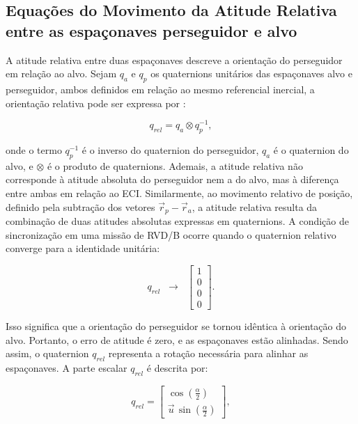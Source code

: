 \subsection{Equações do Movimento da Atitude Relativa entre as espaçonaves perseguidor e alvo}

A atitude relativa entre duas espaçonaves descreve a orientação do perseguidor em relação ao alvo.
Sejam $q_a$ e $q_p$ os quaternions unitários das espaçonaves alvo e perseguidor, ambos definidos em relação ao mesmo referencial inercial, a orientação relativa pode ser expressa por \cite{na2019vision}:

\begin{equation}
q_{rel}
=
q_a \otimes q_p^{-1},
\label{eq:quat_relativo}
\end{equation}

onde o termo $q_p^{-1}$ é o inverso do quaternion do perseguidor, $q_a$ é o quaternion do alvo, e $\otimes$ é o produto de quaternions.
Ademais, a atitude relativa não corresponde à atitude absoluta do perseguidor nem a do alvo, mas à diferença entre ambas em relação ao ECI. 
Similarmente, ao movimento relativo de posição, definido pela subtração dos vetores $\vec r_p - \vec r_a$, a atitude relativa resulta da combinação de duas atitudes absolutas expressas em quaternions. 
A condição de sincronização em uma missão de RVD/B ocorre quando o quaternion relativo converge para a identidade unitária:

\begin{equation}
\label{eq:qrel_sincronizacao}
q_{rel} \;\;\longrightarrow\;\; 
\begin{bmatrix}1 \\ 0 \\ 0 \\ 0\end{bmatrix}.
\end{equation}

Isso significa que a orientação do perseguidor se tornou idêntica à orientação do alvo. 
Portanto, o erro de atitude é zero, e as espaçonaves estão alinhadas.
Sendo assim, o quaternion $q_{rel}$ representa a rotação necessária para alinhar as espaçonaves.
A parte escalar $q_{rel}$ é descrita por:

\begin{equation}
q_{rel} =
\begin{bmatrix}
\cos\!\left(\tfrac{\alpha}{2}\right) \\[4pt]
\vec{u}\,\sin\!\left(\tfrac{\alpha}{2}\right)
\end{bmatrix},
\end{equation}

